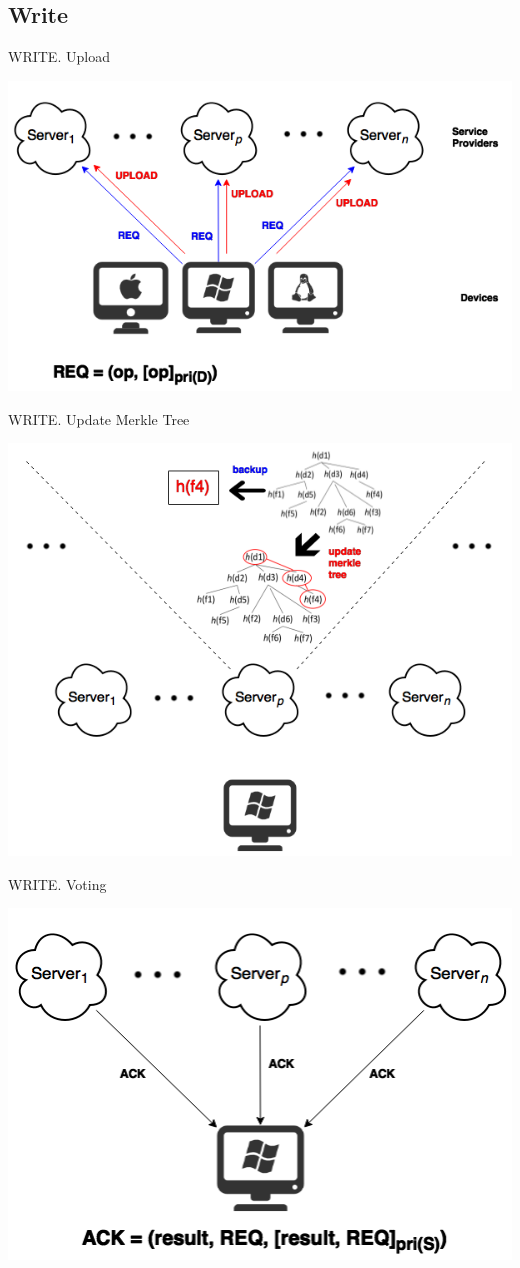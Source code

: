 \documentclass{beamer}
\newcommand{\RNum}[1]{\uppercase\expandafter{\romannumeral #1\relax}}
\begin{document}
\begin{CJK}{UTF8}{bkai}
\subsection{Write}
\begin{frame}{WRITE}{\RNum{1}. Upload}
	\begin{center}
	\includegraphics[width=.8\textwidth]{Write1.png}
	\end{center}
\end{frame}

\begin{frame}{WRITE}{\RNum{2}. Update Merkle Tree}
	\begin{center}
	\includegraphics[width=.65\textwidth]{Write2.png}
	\end{center}
\end{frame}

\begin{frame}{WRITE}{\RNum{3}. Voting}
	\begin{center}
	\includegraphics[width=.7\textwidth]{Write3.png}
	\end{center}
\end{frame}


\end{CJK}
\end{document}
